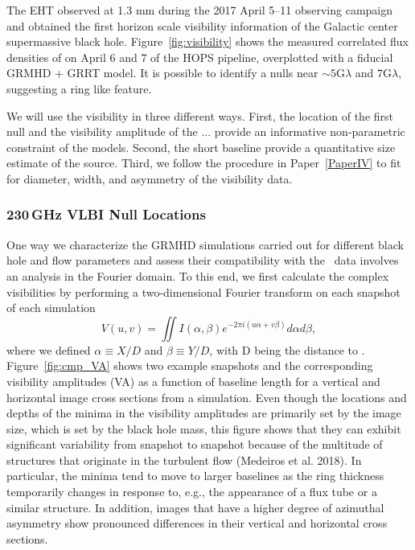 The EHT observed \sgra at 1.3 mm during the 2017 April 5--11 observing
campaign and obtained the first horizon scale visibility information
of the Galactic center supermassive black hole.
Figure~\ref{fig:visibility} shows the measured correlated flux
densities of \sgra on April 6 and 7 of the HOPS pipeline, overplotted
with a fiducial GRMHD + GRRT model.
It is possible to identify a nulls near $\sim 5\mathrm{G}\lambda$ and
$7\mathrm{G}\lambda$, suggesting a ring like feature.

We will use the visibility in three different ways.
First, the location of the first null and the visibility amplitude of
the ... provide an informative non-parametric constraint of the
models.
Second, the short baseline provide a quantitative size estimate of the
source.
Third, we follow the procedure in Paper~\ref{PaperIV} to fit for
diameter, width, and asymmetry of the visibility data.

\subsubsection{230\,GHz VLBI Null Locations}


One way we characterize the GRMHD simulations carried out for
different black hole and flow parameters and assess their
compatibility with the \sgra\ data involves an analysis in the Fourier
domain.
To this end, we first calculate the complex visibilities by performing
a two-dimensional Fourier transform on each snapshot of each
simulation
\begin{equation}
  V(u,v) = \iint I(\alpha,\beta) e^{-2\pi i(u\alpha+v\beta)}d\alpha d\beta,
\end{equation}
where we defined $\alpha \equiv X/D$ and $\beta \equiv Y/D$, with D
being the distance to \sgra.
Figure~\ref{fig:cmp_VA} shows two example snapshots and the
corresponding visibility amplitudes (VA) as a function of baseline
length for a vertical and horizontal image cross sections from a
simulation.
Even though the locations and depths of the minima in the visibility
amplitudes are primarily set by the image size, which is set by the
black hole mass, this figure shows that they can exhibit significant
variability from snapshot to snapshot because of the multitude of
structures that originate in the turbulent flow (Medeiros et
al. 2018).
In particular, the minima tend to move to larger baselines as the ring
thickness temporarily changes in response to, e.g., the appearance of
a flux tube or a similar structure.
In addition, images that have a higher degree of azimuthal asymmetry
show pronounced differences in their vertical and horizontal cross
sections.

